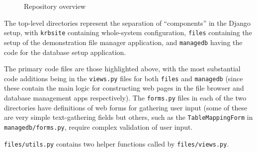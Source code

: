 \documentclass[12pt]{report}
\begin{document}
\begin{figure}[ht]
  \begin{multicols}{2}
    \columnbreak
  \end{multicols}
  \caption{Repository overview}
  \label{fig:repository_overview}
\end{figure}

The top-level directories represent the separation of ``components'' in the Django setup, with \texttt{krbsite} containing whole-system configuration, \texttt{files} containing the setup of the demonstration file manager application, and \texttt{managedb} having the code for the database setup application.

The primary code files are those highlighted above, with the most substantial code additions being in the \texttt{views.py} files for both \texttt{files} and \texttt{managedb} (since these contain the main logic for constructing web pages in the file browser and database management apps respectively). The \texttt{forms.py} files in each of the two directories have definitions of web forms for gathering user input (some of these are very simple text-gathering fields but others, such as the \texttt{TableMappingForm} in \texttt{managedb/forms.py}, require complex validation of user input.

\texttt{files/utils.py} contains two helper functions called by \texttt{files/views.py}.
\end{document}
